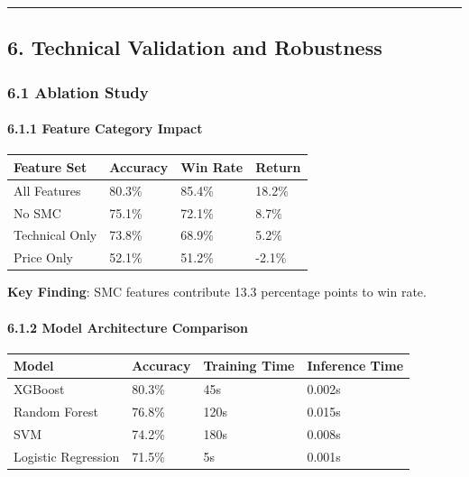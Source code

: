 \begin{center}\rule{0.5\linewidth}{0.5pt}\end{center}

\subsection{6. Technical Validation and
Robustness}\label{technical-validation-and-robustness}

\subsubsection{6.1 Ablation Study}\label{ablation-study}

\paragraph{6.1.1 Feature Category Impact}\label{feature-category-impact}

\begin{longtable}[]{@{}llll@{}}
\toprule\noalign{}
Feature Set & Accuracy & Win Rate & Return \\
\midrule\noalign{}
\endhead
\bottomrule\noalign{}
\endlastfoot
All Features & 80.3\% & 85.4\% & 18.2\% \\
No SMC & 75.1\% & 72.1\% & 8.7\% \\
Technical Only & 73.8\% & 68.9\% & 5.2\% \\
Price Only & 52.1\% & 51.2\% & -2.1\% \\
\end{longtable}

\textbf{Key Finding}: SMC features contribute 13.3 percentage points to
win rate.

\paragraph{6.1.2 Model Architecture
Comparison}\label{model-architecture-comparison}

\begin{longtable}[]{@{}llll@{}}
\toprule\noalign{}
Model & Accuracy & Training Time & Inference Time \\
\midrule\noalign{}
\endhead
\bottomrule\noalign{}
\endlastfoot
XGBoost & 80.3\% & 45s & 0.002s \\
Random Forest & 76.8\% & 120s & 0.015s \\
SVM & 74.2\% & 180s & 0.008s \\
Logistic Regression & 71.5\% & 5s & 0.001s \\
\end{longtable}

